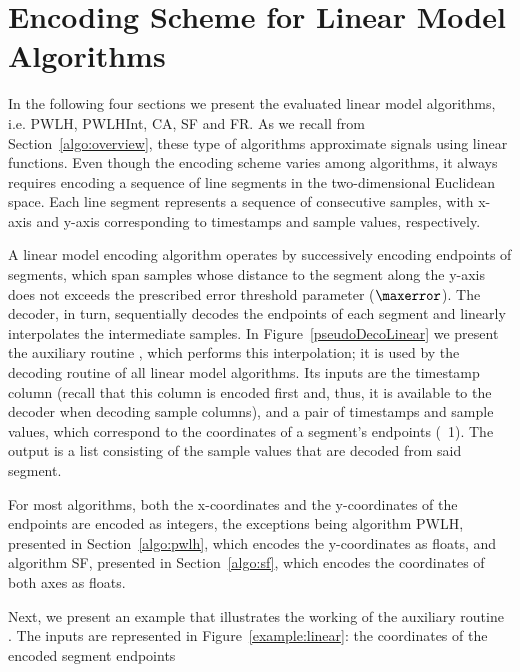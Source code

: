 
\section{Encoding Scheme for Linear Model Algorithms}
\label{algo:decolinear}


In the following four sections we present the evaluated linear model algorithms, i.e. PWLH, PWLHInt, CA, SF and FR. As we recall from Section~\ref{algo:overview}, these type of algorithms approximate signals using linear functions. Even though the encoding scheme varies among algorithms, it always requires encoding a sequence of line segments in the two-dimensional Euclidean space. Each line segment represents a sequence of consecutive samples, with x-axis and y-axis corresponding to timestamps and sample values, respectively.


A linear model encoding algorithm operates by successively encoding endpoints of segments, which span samples whose distance to the segment along the y-axis does not exceeds the prescribed error threshold parameter ($\maxerror$). The decoder, in turn, sequentially decodes the endpoints of each segment and linearly interpolates the intermediate samples. In Figure~\ref{pseudoDecoLinear} we present the auxiliary routine \decodeSegment, which performs this interpolation; it is used by the decoding routine of all linear model algorithms. Its inputs are the timestamp column (recall that this column is encoded first and, thus, it is available to the decoder when decoding sample columns), and a pair of timestamps and sample values, which correspond to the coordinates of a segment's endpoints (\Line~1). The output is a list consisting of the sample values that are decoded from said segment.





\clearpage


For most algorithms, both the x-coordinates and the y-coordinates of the endpoints are encoded as integers, the exceptions being algorithm PWLH, presented in Section~\ref{algo:pwlh}, which encodes the y-coordinates as floats, and algorithm SF, presented in Section~\ref{algo:sf}, which encodes the coordinates of both axes as floats.


Next, we present an example that illustrates the working of the auxiliary routine \decodeSegment. The inputs are represented in Figure~\ref{example:linear}: the coordinates of the encoded segment endpoints

